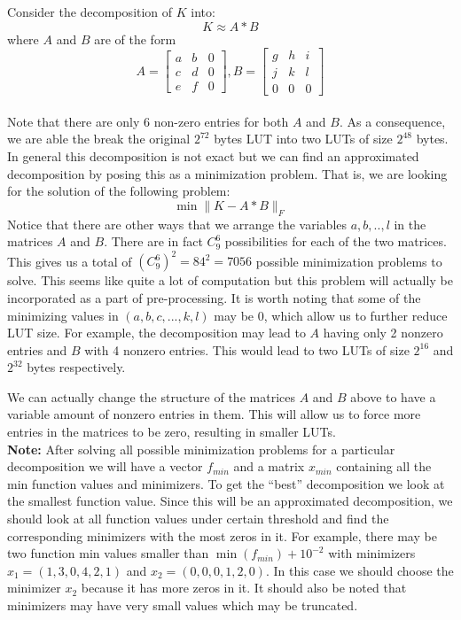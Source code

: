 \documentclass[12pt]{amsart}
\theoremstyle{definition}
\theoremstyle{remark}
\numberwithin{thm}{section}
\begin{document}
Consider the decomposition of $K$ into:
$$K\approx A*B$$
where $A$ and $B$ are of the form
$$\label{general decomposition}
A
=
\begin{bmatrix}
a & b & 0\\
c & d & 0\\
e & f & 0
\end{bmatrix}
,
B=
\begin{bmatrix}
g & h & i\\
j & k & l\\
0 & 0 & 0
\end{bmatrix}$$
\\
Note that there are only 6 non-zero entries for both $A$ and $B$. As a consequence, we are able the break the original $2^{72}$ bytes LUT into two LUTs of size $2^{48}$ bytes. In general this decomposition is not exact but we can find an approximated decomposition by posing this as a minimization problem. That is, we are looking for the solution of the following problem: 
$$\min \|K-A*B\|_F$$
Notice that there are other ways that we arrange the variables $a,b,..,l$ in the matrices $A$ and $B$. There are in fact $C_9^6$ possibilities for each of the two matrices. This gives us a total of  $(C_9^6)^2 =84^2= 7056$ possible minimization problems to solve. This seems like quite a lot of computation but this problem will actually be incorporated as a part of pre-processing. It is worth noting that some of the minimizing values in $(a,b,c,...,k,l)$ may be 0, which allow us to further reduce LUT size. For example, the decomposition may lead to $A$ having only 2 nonzero entries and $B$ with 4 nonzero entries. This would lead to two LUTs of size $2^{16}$ and $2^{32}$ bytes respectively.

We can actually change the structure of the matrices $A$ and $B$ above to have a variable amount of nonzero entries in them. This will allow us to force more entries in the matrices to be zero, resulting in smaller LUTs. 
\\
\textbf{Note:} After solving all possible minimization problems for a particular decomposition we will have a vector \textit{$f_{min}$} and a matrix \textit{$x_{min}$} containing all the min function values and minimizers. To get the ``best'' decomposition we look at the smallest function value. Since this will be an approximated decomposition, we should look at all function values under certain threshold and find the corresponding minimizers with the most zeros in it. For example, there may be two function min values smaller than $\min(f_{min}) + 10^{-2}$ with minimizers $x_1=(1, 3, 0, 4, 2, 1)$ and $x_2=(0, 0, 0, 1, 2, 0)$. In this case we should choose the minimizer $x_2$ because it has more zeros in it. It should also be noted that minimizers may have very small values which may be truncated. 
\end{document}

